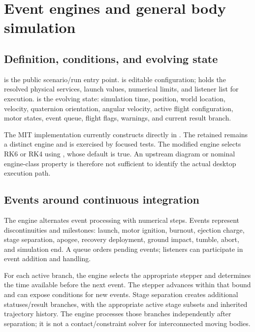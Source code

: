 \chapter{Event engines and general body simulation}\label{ch:engine}
\section{Definition, conditions, and evolving state}
 is the public scenario/run entry point.  is editable configuration;  holds the resolved physical services, launch values, numerical limits, and listener list for execution.  is the evolving state: simulation time, position, world location, velocity, quaternion orientation, angular velocity, active flight configuration, motor states, event queue, flight flags, warnings, and current result branch.

The MIT implementation currently constructs  directly in . The retained  remains a distinct engine and is exercised by focused tests. The modified engine selects RK6 or RK4 using , whose default is true. An upstream diagram or nominal engine-class property is therefore not sufficient to identify the actual desktop execution path.

\section{Events around continuous integration}
The engine alternates event processing with numerical steps. Events represent discontinuities and milestones: launch, motor ignition, burnout, ejection charge, stage separation, apogee, recovery deployment, ground impact, tumble, abort, and simulation end. A queue orders pending events; listeners can participate in event addition and handling.

For each active branch, the engine selects the appropriate stepper and determines the time available before the next event. The stepper advances within that bound and can expose conditions for new events. Stage separation creates additional statuses/result branches, with the appropriate active stage subsets and inherited trajectory history. The engine processes those branches independently after separation; it is not a contact/constraint solver for interconnected moving bodies.

